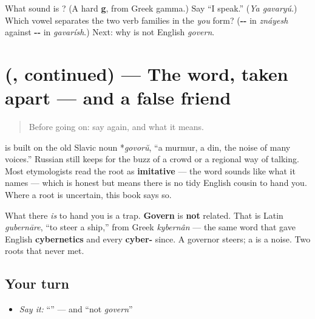 \begin{tcolorbox}[breakable,colback=teal!4,colframe=teal!35!black,title={Before you move on}]
What sound is \textbf{}? (A hard \textbf{g}, from Greek gamma.) Say \textquotedblleft{}I speak.\textquotedblright{} (\emph{Ya gavaryú}.) Which vowel separates the two verb families in the \emph{you} form? (\textbf{--} in \emph{znáyesh} against \textbf{--} in \emph{gavarísh}.) Next: why \emph{} is not English \emph{govern}.
\end{tcolorbox}
\section[\texorpdfstring{(\ru{говорить}, continued)}{(говорить, continued)}]{(, continued) — The word, taken apart — and a false friend}

\label{lesson:RU-C03-govorit-false-friend}



\begin{quote}
Before going on: say \textbf{} again, and what it means.
\end{quote}

\begin{cousinweb}
\textbf{} is built on the old Slavic noun *\emph{govorŭ}, \textquotedblleft{}a murmur, a din, the noise of many voices.\textquotedblright{} Russian still keeps \textbf{} for the buzz of a crowd or a regional way of talking. Most etymologists read the root as \textbf{imitative} — the word sounds like what it names — which is honest but means there is no tidy English cousin to hand you. Where a root is uncertain, this book says so.

What there \emph{is} to hand you is a trap. \textbf{Govern} is \textbf{not} related. That is Latin \emph{gubernāre}, \textquotedblleft{}to steer a ship,\textquotedblright{} from Greek \emph{kybernân} — the same word that gave English \textbf{cybernetics} and every \textbf{cyber-} since. A governor steers; a \emph{} is a noise. Two roots that never met.
\end{cousinweb}

\subsection*{Your turn}
\begin{itemize}
\raggedright
  \item \emph{Say it:} \textquotedblleft{}\textquotedblright{} — and \textquotedblleft{}not \emph{govern}\textquotedblright{}
\end{itemize}

